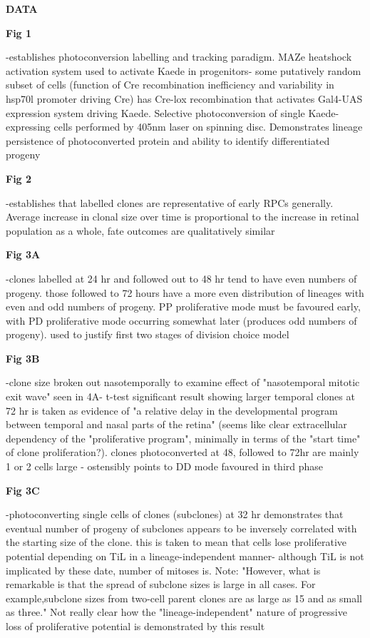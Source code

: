 \bigskip

\textbf{DATA}

\bigskip

\textbf{Fig 1}

-establishes photoconversion labelling and tracking paradigm. MAZe heatshock activation system used to activate Kaede in progenitors- some putatively random subset of cells (function of Cre recombination inefficiency and variability in hsp70l promoter driving Cre) has Cre-lox recombination that activates Gal4-UAS expression system driving Kaede. Selective photoconversion of single Kaede-expressing cells performed by 405nm laser on spinning disc. Demonstrates lineage persistence of photoconverted protein and ability to identify differentiated progeny

\bigskip

\textbf{Fig 2}

-establishes that labelled clones are representative of early RPCs generally. Average increase in clonal size over time is proportional to the increase in retinal population as a whole, fate outcomes are qualitatively similar

\bigskip

\textbf{Fig 3A}

-clones labelled at 24 hr and followed out to 48 hr tend to have even numbers of progeny. those followed to 72 hours have a more even distribution of lineages with even and odd numbers of progeny. PP proliferative mode must be favoured early, with PD proliferative mode occurring somewhat later (produces odd numbers of progeny). used to justify first two stages of division choice model

\textbf{Fig 3B}

-clone size broken out nasotemporally to examine effect of "nasotemporal mitotic exit wave" seen in 4A- t-test significant result showing larger temporal clones at 72 hr is taken as evidence of "a relative delay in the developmental program between temporal and nasal parts of the retina" (seems like clear extracellular dependency of the "proliferative program", minimally in terms of the "start time" of clone proliferation?). clones photoconverted at 48, followed to 72hr are mainly 1 or 2 cells large - ostensibly points to DD mode favoured in third phase

\textbf{Fig 3C}

-photoconverting single cells of clones (subclones) at 32 hr demonstrates that eventual number of progeny of subclones appears to be inversely correlated with the starting size of the clone. this is taken to mean that cells lose proliferative potential depending on TiL in a lineage-independent manner- although TiL is not implicated by these date, number of mitoses is. Note: "However, what is remarkable is that the spread of subclone sizes is large in all cases. For example,subclone sizes from two-cell parent clones are as large as 15 and as small as three." Not really clear how the "lineage-independent" nature of progressive loss of proliferative potential is demonstrated by this result

